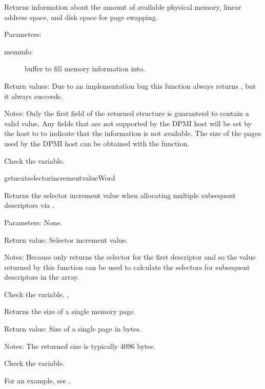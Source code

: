 { Returns information about the amount of available physical memory, linear
address space, and disk space for page swapping.

Parameters:
\begin{description}
\item[meminfo:\ ] buffer to fill memory information into.
\end{description}

Return values: Due to an implementation bug this function always returns
, but it always succeeds.

Notes: Only the first field of the returned structure is guaranteed to
contain a valid value. Any fields that are not supported by the DPMI host
will be set by the host to  to indicate that the information
is not available. The size of the pages used by the DPMI host can be
obtained with the   function.
}
{Check the  variable.}
{ }

\html{}

{getnextselectorincrementvalue}{Word}
{Returns the selector increment value when allocating multiple subsequent
descriptors via .

Parameters: None.

Return value: Selector increment value.

Notes: Because  only returns the selector for the
first descriptor and so the value returned by this function can be used to
calculate the selectors for subsequent descriptors in the array.
}{ Check the  variable.}
{ , 
 }

{ Returns the size of a single memory page.

Return value: Size of a single page in bytes.

Notes: The returned size is typically 4096 bytes.
}
{ Check the  variable.}
{  }

For an example, see .

